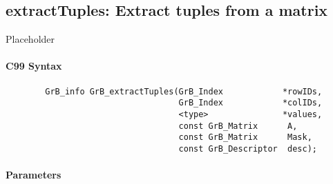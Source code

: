 
\subsection{{\sf extractTuples}: Extract tuples from a matrix}
\label{Sec:extractTuples}

Placeholder


\paragraph{C99 Syntax}

\begin{verbatim}
        GrB_info GrB_extractTuples(GrB_Index            *rowIDs,
                                   GrB_Index            *colIDs,
                                   <type>               *values, 
                                   const GrB_Matrix      A,
                                   const GrB_Matrix      Mask,
                                   const GrB_Descriptor  desc);
\end{verbatim}

\paragraph{Parameters}

